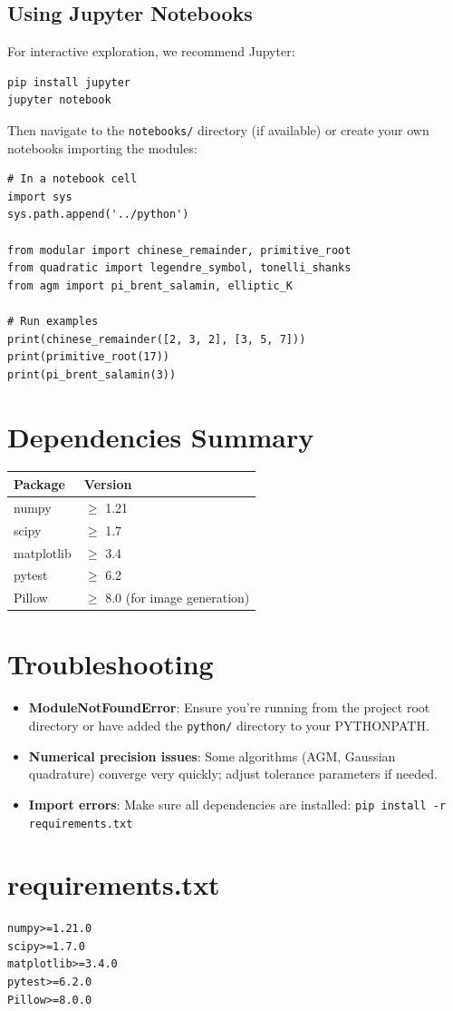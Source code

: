 \subsection{Using Jupyter Notebooks}

For interactive exploration, we recommend Jupyter:

\begin{lstlisting}[style=bash]
pip install jupyter
jupyter notebook
\end{lstlisting}

Then navigate to the \texttt{notebooks/} directory (if available) or create your own notebooks importing the modules:

\begin{lstlisting}[style=python]
# In a notebook cell
import sys
sys.path.append('../python')

from modular import chinese_remainder, primitive_root
from quadratic import legendre_symbol, tonelli_shanks
from agm import pi_brent_salamin, elliptic_K

# Run examples
print(chinese_remainder([2, 3, 2], [3, 5, 7]))
print(primitive_root(17))
print(pi_brent_salamin(3))
\end{lstlisting}

\section{Dependencies Summary}

\begin{table}[H]
\centering
\begin{tabular}{ll}
\toprule
\textbf{Package} & \textbf{Version} \\
\midrule
numpy & $\ge$ 1.21 \\
scipy & $\ge$ 1.7 \\
matplotlib & $\ge$ 3.4 \\
pytest & $\ge$ 6.2 \\
Pillow & $\ge$ 8.0 (for image generation) \\
\bottomrule
\end{tabular}
\end{table}

\section{Troubleshooting}

\begin{itemize}
    \item \textbf{ModuleNotFoundError}: Ensure you're running from the project root directory or have added the \texttt{python/} directory to your PYTHONPATH.
    \item \textbf{Numerical precision issues}: Some algorithms (AGM, Gaussian quadrature) converge very quickly; adjust tolerance parameters if needed.
    \item \textbf{Import errors}: Make sure all dependencies are installed: \texttt{pip install -r requirements.txt}
\end{itemize}

\section{requirements.txt}

\begin{lstlisting}[style=txt, caption={requirements.txt}]
numpy>=1.21.0
scipy>=1.7.0
matplotlib>=3.4.0
pytest>=6.2.0
Pillow>=8.0.0
\end{lstlisting}